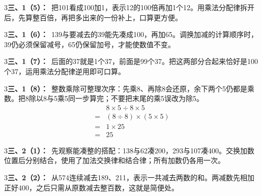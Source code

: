 \documentclass[multi=snippet,border={5bp 20bp 5bp 5bp}]{standalone}
\newenvironment{snippet}[3]{\begin{minipage}{#1bp}\color{answerred}\fontsize{#2}{#3}\selectfont\raggedright}{\end{minipage}}
\begin{document}
\begin{snippet}{505}{11.5}{14}\begin{multicols}{3}\raggedcolumns \textbf{三、1（5）：}\ 把101看成100加1，表示12的100倍再加1个12。用乘法分配律拆开后，先算整百倍，再把多出来的一份补上，口算更方便。\end{multicols}\end{snippet}
\begin{snippet}{505}{11.5}{14}\begin{multicols}{3}\raggedcolumns \textbf{三、1（6）：}\ 139与要减去的39能先凑成100，再加65。调换加减的计算顺序时，39仍必须保留减号，65仍保留加号，才能使数值不变。\end{multicols}\end{snippet}
\begin{snippet}{505}{11.5}{14}\begin{multicols}{3}\raggedcolumns \textbf{三、1（7）：}\ 后面的37就是1个37，前面是99个37。把这两部分合起来恰好是100个37，运用乘法分配律逆用即可口算。\end{multicols}\end{snippet}
\begin{snippet}{505}{11.5}{14}\begin{multicols}{3}\raggedcolumns \textbf{三、1（8）：}\ 整数乘除可整理次序：先乘8、再除8会还原，余下两个5仍都是乘数。把8除以8与5乘5同一步算完；不要把末尾的乘5误改为除5。\[\begin{aligned}&8\times5\div8\times5\\={}&(8\div8)\times(5\times5)\\={}&1\times25\\={}&25\end{aligned}\]\end{multicols}\end{snippet}
\begin{snippet}{505}{11.5}{14}\begin{multicols}{3}\raggedcolumns \textbf{三、2（1）：}\ 先观察能凑整的搭配：138与62凑200，293与107凑400。交换加数位置后分别结合，使用了加法交换律和结合律；所有加数仍各用一次。\end{multicols}\end{snippet}
\begin{snippet}{505}{11.5}{14}\begin{multicols}{3}\raggedcolumns \textbf{三、2（2）：}\ 从574连续减去189、211，表示一共减去两数的和。两减数先相加正好400，之后只需从原数减去整百数，这就是简便处。\end{multicols}\end{snippet}
\end{document}
